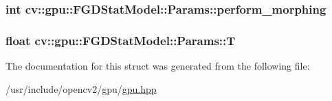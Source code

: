 \hypertarget{structcv_1_1gpu_1_1FGDStatModel_1_1Params_a0f0a1c9ddd3b66d1b3a4aa10826dd0a7}{
\subsubsection[{perform\-\_\-morphing}]{\setlength{\rightskip}{0pt plus 5cm}int cv\-::gpu\-::\-F\-G\-D\-Stat\-Model\-::\-Params\-::perform\-\_\-morphing}}\label{structcv_1_1gpu_1_1FGDStatModel_1_1Params_a0f0a1c9ddd3b66d1b3a4aa10826dd0a7}
\hypertarget{structcv_1_1gpu_1_1FGDStatModel_1_1Params_a16c905f2d50f44f6ccf5c62efc1bfb64}{
\subsubsection[{T}]{\setlength{\rightskip}{0pt plus 5cm}float cv\-::gpu\-::\-F\-G\-D\-Stat\-Model\-::\-Params\-::\-T}}\label{structcv_1_1gpu_1_1FGDStatModel_1_1Params_a16c905f2d50f44f6ccf5c62efc1bfb64}


The documentation for this struct was generated from the following file\-:\begin{DoxyCompactItemize}
\item 
/usr/include/opencv2/gpu/\hyperlink{gpu_2gpu_8hpp}{gpu.\-hpp}\end{DoxyCompactItemize}
